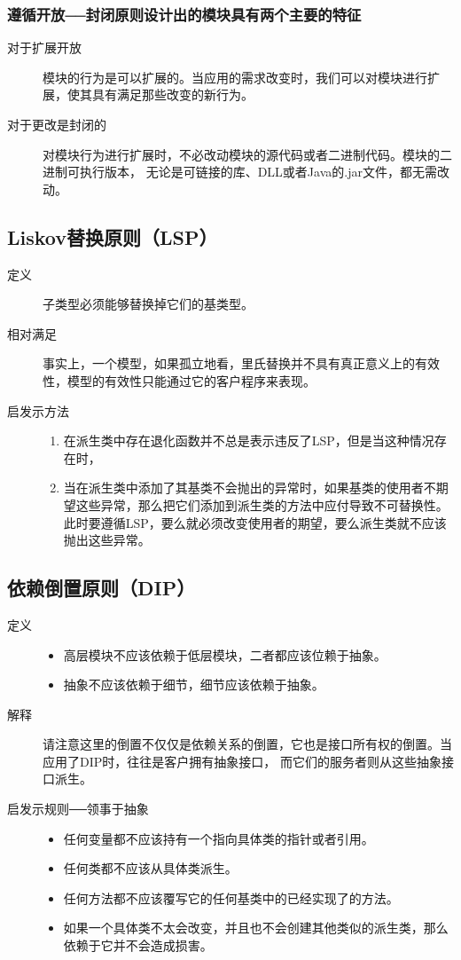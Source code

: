 \documentclass[11pt]{article}
\begin{document}
\subsubsection{遵循开放──封闭原则设计出的模块具有两个主要的特征}
\label{sec:org375308c}
\begin{description}
\item[{对于扩展开放}] 模块的行为是可以扩展的。当应用的需求改变时，我们可以对模块进行扩展，使其具有满足那些改变的新行为。
\item[{对于更改是封闭的}] 对模块行为进行扩展时，不必改动模块的源代码或者二进制代码。模块的二进制可执行版本，
无论是可链接的库、DLL或者Java的.jar文件，都无需改动。
\end{description}
\subsection{Liskov替换原则（LSP）}
\label{sec:org447d111}
\begin{description}
\item[{定义}] 子类型必须能够替换掉它们的基类型。
\item[{相对满足}] 事实上，一个模型，如果孤立地看，里氏替换并不具有真正意义上的有效性，模型的有效性只能通过它的客户程序来表现。
\item[{启发示方法}] \begin{enumerate}
\item 在派生类中存在退化函数并不总是表示违反了LSP，但是当这种情况存在时，
\item 当在派生类中添加了其基类不会抛出的异常时，如果基类的使用者不期望这些异常，那么把它们添加到派生类的方法中应付导致不可替换性。
此时要遵循LSP，要么就必须改变使用者的期望，要么派生类就不应该抛出这些异常。
\end{enumerate}
\end{description}
\subsection{依赖倒置原则（DIP）}
\label{sec:orgc9543b9}
\begin{description}
\item[{定义}] \begin{itemize}
\item 高层模块不应该依赖于低层模块，二者都应该位赖于抽象。
\item 抽象不应该依赖于细节，细节应该依赖于抽象。
\end{itemize}
\item[{解释}] 请注意这里的倒置不仅仅是依赖关系的倒置，它也是接口所有权的倒置。当应用了DIP时，往往是客户拥有抽象接口，
而它们的服务者则从这些抽象接口派生。
\item[{启发示规则──领事于抽象}] \begin{itemize}
\item 任何变量都不应该持有一个指向具体类的指针或者引用。
\item 任何类都不应该从具体类派生。
\item 任何方法都不应该覆写它的任何基类中的已经实现了的方法。
\item 如果一个具体类不太会改变，并且也不会创建其他类似的派生类，那么依赖于它并不会造成损害。
\end{itemize}
\end{description}
\end{document}
